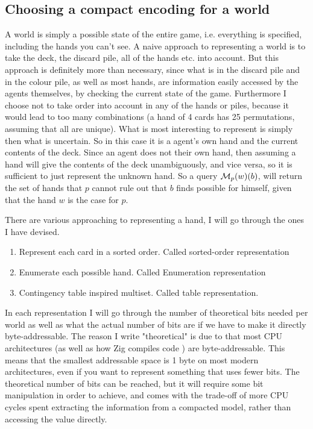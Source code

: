 \subsection{Choosing a compact encoding for a world} \label{sec:representing-a-world}
A world is simply a possible state of the entire game, i.e. everything is specified, including the hands you can't see.
A naive approach to representing a world is to take the deck, the discard pile, all of the hands etc. into account.
But this approach is definitely more than necessary, since what is in the discard pile and in the colour pile, as well as most hands, are information easily accessed by the agents themselves, by checking the current state of the game.
Furthermore I choose not to take order into account in any of the hands or piles, because it would lead to too many combinations (a hand of 4 cards has 25 permutations, assuming that all are unique).
What is most interesting to represent is simply then what is uncertain.
So in this case it is a agent's own hand and the current contents of the deck.
Since an agent does not their own hand, then assuming a hand will give the contents of the deck unambiguously, and vice versa, so it is sufficient to just represent the unknown hand.
So a query $\mathcal{M}_p(w)(b)$, will return the set of hands that $p$ cannot rule out that $b$ finds possible for himself, given that the hand $w$ is the case for $p$.

There are various approaching to representing a hand, I will go through the ones I have devised. 

\begin{enumerate}
\item Represent each card in a sorted order. Called sorted-order representation
\item Enumerate each possible hand. Called Enumeration representation
\item Contingency table inspired multiset. Called table representation.
\end{enumerate}

In each representation I will go through the number of theoretical bits needed per world as well as what the actual number of bits are if we have to make it directly byte-addressable.
The reason I write "theoretical" is due to that most CPU architectures (as well as how Zig compiles code \cite{zigdocspackedstruct}) are byte-addressable.
This means that the smallest addressable space is 1 byte on most modern architectures, even if you want to represent something that uses fewer bits.
The theoretical number of bits can be reached, but it will require some bit manipulation in order to achieve, and comes with the trade-off of more CPU cycles spent extracting the information from a compacted model, rather than accessing the value directly. 


